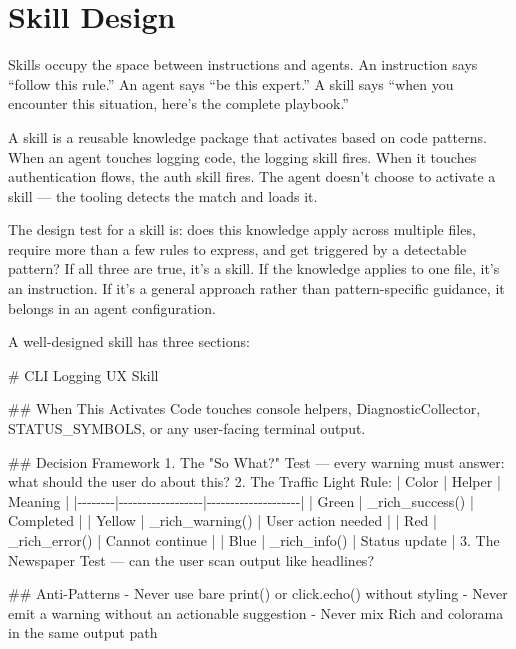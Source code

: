 \documentclass[
  a4paper,
  DIV=11,
  numbers=noendperiod]{scrreprt}
\newenvironment{Shaded}{\begin{snugshade}}{\end{snugshade}}
\newcommand{\FunctionTok}[1]{\textcolor[rgb]{0.28,0.35,0.67}{#1}}
\newcommand{\NormalTok}[1]{\textcolor[rgb]{0.00,0.23,0.31}{#1}}
\newcommand{\SpecialStringTok}[1]{\textcolor[rgb]{0.13,0.47,0.30}{#1}}
\begin{document}
\section{Skill Design}\label{skill-design}

Skills occupy the space between instructions and agents. An instruction
says ``follow this rule.'' An agent says ``be this expert.'' A skill
says ``when you encounter this situation, here's the complete
playbook.''

A skill is a reusable knowledge package that activates based on code
patterns. When an agent touches logging code, the logging skill fires.
When it touches authentication flows, the auth skill fires. The agent
doesn't choose to activate a skill --- the tooling detects the match and
loads it.

The design test for a skill is: does this knowledge apply across
multiple files, require more than a few rules to express, and get
triggered by a detectable pattern? If all three are true, it's a skill.
If the knowledge applies to one file, it's an instruction. If it's a
general approach rather than pattern-specific guidance, it belongs in an
agent configuration.

A well-designed skill has three sections:

\begin{Shaded}
\begin{Highlighting}[]
\FunctionTok{\# CLI Logging UX Skill}

\FunctionTok{\#\# When This Activates}
\NormalTok{Code touches console helpers, DiagnosticCollector,}
\NormalTok{STATUS\_SYMBOLS, or any user{-}facing terminal output.}

\FunctionTok{\#\# Decision Framework}
\SpecialStringTok{1. }\NormalTok{The "So What?" Test — every warning must answer:}
\NormalTok{   what should the user do about this?}
\SpecialStringTok{2. }\NormalTok{The Traffic Light Rule:}
\NormalTok{   | Color  | Helper           | Meaning            |}
\NormalTok{   |{-}{-}{-}{-}{-}{-}{-}{-}|{-}{-}{-}{-}{-}{-}{-}{-}{-}{-}{-}{-}{-}{-}{-}{-}{-}{-}|{-}{-}{-}{-}{-}{-}{-}{-}{-}{-}{-}{-}{-}{-}{-}{-}{-}{-}{-}{-}|}
\NormalTok{   | Green  | \_rich\_success()  | Completed          |}
\NormalTok{   | Yellow | \_rich\_warning()  | User action needed |}
\NormalTok{   | Red    | \_rich\_error()    | Cannot continue    |}
\NormalTok{   | Blue   | \_rich\_info()     | Status update      |}
\SpecialStringTok{3. }\NormalTok{The Newspaper Test — can the user scan output like headlines?}

\FunctionTok{\#\# Anti{-}Patterns}
\SpecialStringTok{{-} }\NormalTok{Never use bare print() or click.echo() without styling}
\SpecialStringTok{{-} }\NormalTok{Never emit a warning without an actionable suggestion}
\SpecialStringTok{{-} }\NormalTok{Never mix Rich and colorama in the same output path}
\end{Highlighting}
\end{Shaded}
\end{document}
